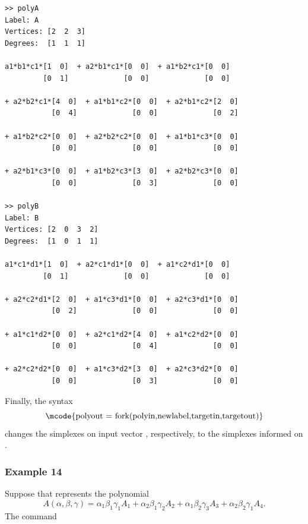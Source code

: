 \documentclass[english,11pt]{article}
\theoremstyle{break} \theorembodyfont{\small\rm}
\begin{document}
\begin{minipage}{15.5cm}
\begin{lstlisting}[rulecolor=\color{red}]
>> polyA
Label: A
Vertices: [2  2  3]
Degrees:  [1  1  1]
 
a1*b1*c1*[1  0]  + a2*b1*c1*[0  0]  + a1*b2*c1*[0  0] 
         [0  1]             [0  0]             [0  0] 
         
+ a2*b2*c1*[4  0]  + a1*b1*c2*[0  0]  + a2*b1*c2*[2  0]  
           [0  4]             [0  0]             [0  2]        
           
+ a1*b2*c2*[0  0]  + a2*b2*c2*[0  0]  + a1*b1*c3*[0  0]   
           [0  0]             [0  0]             [0  0] 
           
+ a2*b1*c3*[0  0]  + a1*b2*c3*[3  0]  + a2*b2*c3*[0  0]
           [0  0]             [0  3]             [0  0]
           
>> polyB
Label: B
Vertices: [2  0  3  2]
Degrees:  [1  0  1  1]
 
a1*c1*d1*[1  0]  + a2*c1*d1*[0  0]  + a1*c2*d1*[0  0]  
         [0  1]             [0  0]             [0  0]  
         
+ a2*c2*d1*[2  0]  + a1*c3*d1*[0  0]  + a2*c3*d1*[0  0]    
           [0  2]             [0  0]             [0  0]    
         
+ a1*c1*d2*[0  0]  + a2*c1*d2*[4  0]  + a1*c2*d2*[0  0]              
           [0  0]             [0  4]             [0  0]              
         
+ a2*c2*d2*[0  0]  + a1*c3*d2*[3  0]  + a2*c3*d2*[0  0]              
           [0  0]             [0  3]             [0  0]              
\end{lstlisting}
\end{minipage}
\vspace{0.2cm}


Finally, the syntax
\[
\mbox{\mcode{polyout = fork(polyin,newlabel,targetin,targetout)}}
\]
changes the simplexes on input vector , respectively, to the simplexes informed on
.

\subsubsection*{Example 14}
Suppose that  represents the polynomial
\[
 A(\alpha,\beta,\gamma) = \alpha_1 \beta_1 \gamma_1 A_1 + \alpha_2 \beta_1 \gamma_2 A_2  + \alpha_1 \beta_2 \gamma_3 A_3 + \alpha_2 \beta_2 \gamma_1 A_4.
\]
The command

\vspace{0.5cm}%
\begin{minipage}{8.5cm}
\end{minipage}
\vspace{0.2cm}
\end{document}
